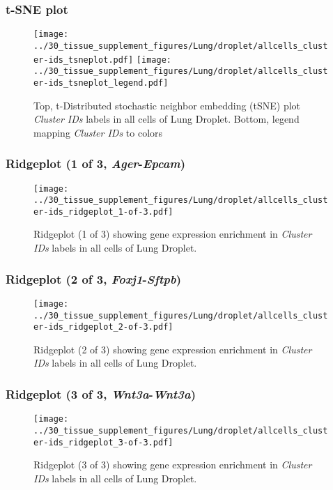 \clearpage
\subsubsection{t-SNE plot}
\begin{figure}[h]
\centering
\texttt{[image: ../30\_tissue\_supplement\_figures/Lung/droplet/allcells\_cluster-ids\_tsneplot.pdf]}
\texttt{[image: ../30\_tissue\_supplement\_figures/Lung/droplet/allcells\_cluster-ids\_tsneplot\_legend.pdf]}
\caption{Top, t-Distributed stochastic neighbor embedding (tSNE) plot  \emph{Cluster IDs} labels in all cells of Lung Droplet. Bottom, legend mapping \emph{Cluster IDs} to colors}
\end{figure}


\clearpage

\subsubsection{Ridgeplot (1 of 3, \emph{Ager}-\emph{Epcam})}
\begin{figure}[h]
\centering
\texttt{[image: ../30\_tissue\_supplement\_figures/Lung/droplet/allcells\_cluster-ids\_ridgeplot\_1-of-3.pdf]}

\caption{ Ridgeplot (1 of 3)  showing gene expression enrichment in \emph{Cluster IDs} labels in all cells of Lung Droplet. }
\end{figure}


\clearpage

\subsubsection{Ridgeplot (2 of 3, \emph{Foxj1}-\emph{Sftpb})}
\begin{figure}[h]
\centering
\texttt{[image: ../30\_tissue\_supplement\_figures/Lung/droplet/allcells\_cluster-ids\_ridgeplot\_2-of-3.pdf]}

\caption{ Ridgeplot (2 of 3)  showing gene expression enrichment in \emph{Cluster IDs} labels in all cells of Lung Droplet. }
\end{figure}


\clearpage

\subsubsection{Ridgeplot (3 of 3, \emph{Wnt3a}-\emph{Wnt3a})}
\begin{figure}[h]
\centering
\texttt{[image: ../30\_tissue\_supplement\_figures/Lung/droplet/allcells\_cluster-ids\_ridgeplot\_3-of-3.pdf]}

\caption{ Ridgeplot (3 of 3)  showing gene expression enrichment in \emph{Cluster IDs} labels in all cells of Lung Droplet. }
\end{figure}


